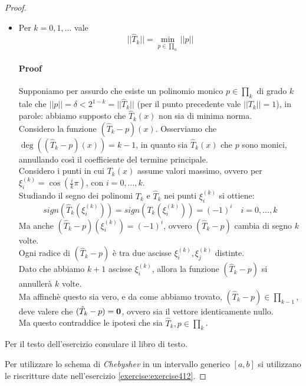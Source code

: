 \begin{proof}
\begin{itemize}
  \item Per $k = 0, 1, \ldots$ vale 
  \begin{displaymath}
  ||\hat{T}_{k}|| = \min_{p\in \prod_{n}}{||p||}
  \end{displaymath}
  \paragraph{Proof} Supponiamo per assurdo che esiste un polinomio monico $p
  \in \prod_{k}$ di grado $k$ tale che $||p|| = \delta < 2^{1-k} =
  ||\hat{T}_{k}||$ (per il punto precedente vale $||T_{k}|| = 1$), in parole:
  abbiamo supposto che $\hat{T}_{k}(x)$ non sia di minima norma. 
  \\ Considero la funzione $(\hat{T}_{k} - p)(x)$. Osserviamo che
  $\deg((\hat{T}_{k} - p)(x)) = k-1$, in quanto sia $\hat{T}_{k}(x)$ che $p$
  sono monici, annullando cos\`i il coefficiente del termine principale.
  \\Considero i punti in cui $T_{k}(x)$ assume valori massimo, ovvero per 
  $\xi_{i}^{(k)} = \cos\left(\frac{i}{k}\pi\right)$, con $i = 0,\ldots,k$.
  \\Studiando il segno dei polinomi $T_{k}$ e $\hat{T}_{k}$ nei punti
  $\xi_{i}^{(k)}$ si ottiene: $$sign(\hat{T}_{k}(\xi_{i}^{(k)})) =
  sign(T_{k}(\xi_{i}^{(k)})) = (-1)^{i} \quad i = 0,\ldots,k$$
  Ma anche $(\hat{T}_{k} - p)(\xi_{i}^{(k)}) = (-1)^{i}$, ovvero $(\hat{T}_{k} -
  p)$ cambia di segno $k$ volte. 
  \\ Ogni radice di $(\hat{T}_{k} - p)$ \`e tra due
  ascisse $\xi_{i}^{(k)}, \xi_{j}^{(k)}$ distinte. 
  \\ Dato che abbiamo $k+1$ ascisse $\xi_{i}^{(k)}$, allora la funzione
  $(\hat{T}_{k} - p)$ si annuller\`a $k$ volte. 
  \\ Ma affinch\`e questo sia vero, e da come abbiamo trovato, $(\hat{T}_{k} -
  p) \in \prod_{k-1}$, deve valere che $(\hat{T}_{k} - p) = \boldsymbol{0}$, ovvero 
  sia il vettore identicamente nullo.\\ 
  Ma questo contraddice le ipotesi che sia
  $\hat{T}_{k}, p \in \prod_{k}$.
\end{itemize}

\begin{exercise}[4.14]
Per il testo dell'esercizio consulare il libro di testo.
\end{exercise}
Per utilizzare lo schema di \emph{Chebyshev} in un intervallo generico $[a,b]$
si utilizzano le riscritture date nell'esercizio \ref{exercise:exercise412}. 

\end{proof}

